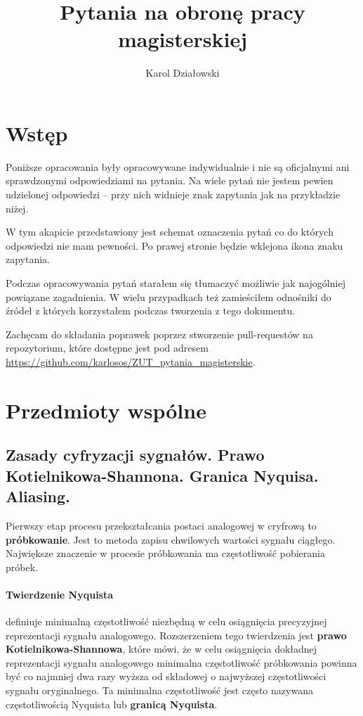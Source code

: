 \documentclass[wi]{zut}
\author{Karol Działowski}
\title{Pytania na obronę pracy magisterskiej}
\begin{document}
\maketitle
\tableofcontents

\section{Wstęp}

Poniższe opracowania były opracowywane indywidualnie i nie są oficjalnymi ani sprawdzonymi odpowiedziami na pytania. Na wiele pytań nie jestem pewien udzielonej odpowiedzi -- przy nich widnieje znak zapytania jak na przykładzie niżej.

W tym akapicie przedstawiony jest schemat oznaczenia pytań co do których odpowiedzi nie mam pewności. Po prawej stronie będzie wklejona ikona znaku zapytania.
\question

Podczas opracowywania pytań starałem się tłumaczyć możliwie jak najogólniej powiązane zagadnienia. W wielu przypadkach też zamieściłem odnośniki do źródeł z których korzystałem podczas tworzenia z tego dokumentu.

Zachęcam do składania poprawek poprzez stworzenie pull-requestów na repozytorium, które dostępne jest pod adresem \url{https://github.com/karlosos/ZUT_pytania_magisterskie}.

\section{Przedmioty wspólne}

\subsection{Zasady cyfryzacji sygnałów. Prawo Kotielnikowa-Shannona. Granica Nyquisa. Aliasing.}

Pierwszy etap procesu przekształcania postaci analogowej w cryfrową to \textbf{próbkowanie}. Jest to metoda zapisu chwilowych wartości sygnału ciągłego. Największe znaczenie w procesie próbkowania ma częstotliwość pobierania próbek.

\paragraph{Twierdzenie Nyquista} definiuje minimalną częstotliwość niezbędną w celu osiągnięcia precyzyjnej reprezentacji sygnału analogowego. Rozszerzeniem tego twierdzenia jest \textbf{prawo Kotielnikowa-Shannowa}, które mówi, że w celu osiągnięcia dokładnej reprezentacji sygnału analogowego minimalna częstotliwość próbkowania powinna być co najmniej dwa razy wyższa od składowej o najwyższej częstotliwości sygnału oryginalnego. Ta minimalna częstotliwość jest często nazywana częstotliwością Nyquista lub \textbf{granicą Nyquista}.
\end{document}
